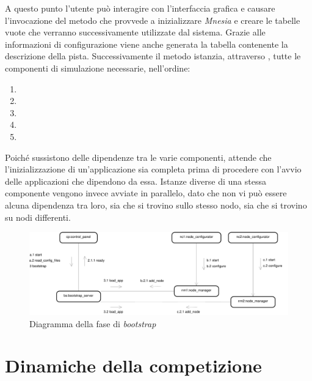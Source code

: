A questo punto l'utente può interagire con l'interfaccia grafica e causare l'invocazione del metodo  che provvede a inizializzare \textsl{Mnesia} e creare le tabelle vuote che verranno successivamente utilizzate dal sistema. Grazie alle informazioni di configurazione viene anche generata la tabella contenente la descrizione della pista. Successivamente il metodo  istanzia, attraverso , tutte le componenti di simulazione necessarie, nell'ordine:
\begin{enumerate}
\item \evdisp{}
\item \sched{}
\item \weather{}
\item \team{}
\item \car{}
\end{enumerate}
Poiché sussistono delle dipendenze tra le varie componenti, \bootserv{} attende che l'inizializzazione di un'applicazione sia completa prima di procedere con l'avvio delle applicazioni che dipendono da essa. Istanze diverse di una stessa componente vengono invece avviate in parallelo, dato che non vi può essere alcuna dipendenza tra loro, sia che si trovino sullo stesso nodo, sia che si trovino su nodi differenti.

\begin{landscape}
\begin{figure}
\includegraphics[height=.25\paperheight]{diagrammi/Bootstrap}
\caption{Diagramma della fase di \textit{bootstrap}}
\label{fig:bootstrap}
\end{figure}
\end{landscape}

\section{Dinamiche della competizione}
